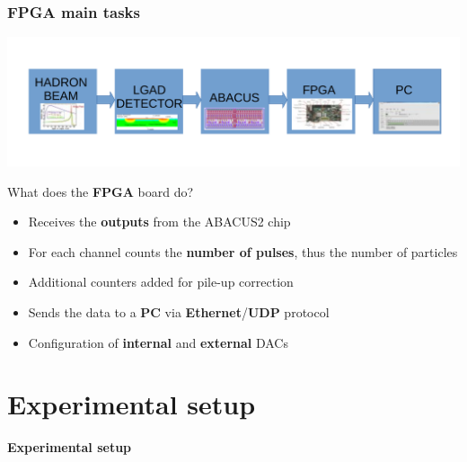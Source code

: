 \documentclass[aspectratio=169]{beamer}
\begin{document}
\begin{frame}
	\frametitle{FPGA main tasks}
	\vspace*{-2.7mm}
	\begin{center}
		\includegraphics[width=0.85 \textwidth]{IMG/Block_Diagram.pdf}
	\end{center}
	\vspace*{-5mm}
	\begin{center}
		{\Large \color{blue} What does the \textbf{FPGA} board do?}\\[3mm]
		\begin{itemize}
			\item Receives the \textbf{outputs} from the ABACUS2 chip
			\item For each channel counts the \textbf{number of pulses}, thus the number of particles
			\item Additional counters added for pile-up correction
			\item Sends the data to a \textbf{PC} via \textbf{Ethernet}/\textbf{UDP} protocol
			\item Configuration of \textbf{internal} and \textbf{external} DACs
		\end{itemize}
	\end{center}
\end{frame}

	
\section{Experimental setup}

\begin{frame}
\begin{center}
	{\Huge {}\selectfont \color{blue} \textbf{Experimental setup}}
\end{center}
\end{frame}
\end{document}
